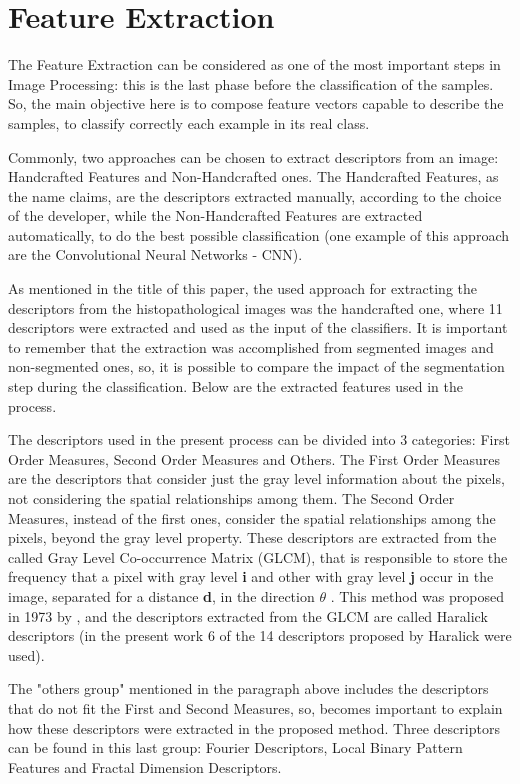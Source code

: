 \documentclass[conference]{IEEEtran}
\begin{document}
	\section{Feature Extraction}
        \par The Feature Extraction can be considered as one of the most important steps in Image Processing: this is the last phase before the classification of the samples. So, the main objective here is to compose feature vectors capable to describe the samples, to classify correctly each example in its real class.
        \par Commonly, two approaches can be chosen to extract descriptors from an image: Handcrafted Features and Non-Handcrafted ones. The Handcrafted Features, as the name claims, are the descriptors extracted manually, according to the choice of the developer, while the Non-Handcrafted Features are extracted automatically, to do the best possible classification (one example of this approach are the Convolutional Neural Networks - CNN).
		\par As mentioned in the title of this paper, the used approach for extracting the descriptors from the histopathological images was the handcrafted one, where 11 descriptors were extracted and used as the input of the classifiers. It is important to remember that the extraction was accomplished from segmented images and non-segmented ones, so, it is possible to compare the impact of the segmentation step during the classification. Below are the extracted features used in the process.
		\par The descriptors used in the present process can be divided into 3 categories: First Order Measures, Second Order Measures and Others. The First Order Measures are the descriptors that consider just the gray level information about the pixels, not considering the spatial relationships among them. The Second Order Measures, instead of the first ones, consider the spatial relationships among the pixels, beyond the gray level property. These descriptors are extracted from the called Gray Level Co-occurrence Matrix (GLCM), that is responsible to store the frequency that a pixel with gray level \textbf{i} and other with gray level \textbf{j} occur in the image, separated for a distance \textbf{d}, in the direction\textbf{ $\theta$} \cite{conci2008computacao}. This method was proposed in 1973 by \cite{haralick:smc1973}, and the descriptors extracted from the GLCM are called Haralick descriptors (in the present work 6 of the 14 descriptors proposed by Haralick were used).
		\par The "others group" mentioned in the paragraph above includes the descriptors that do not fit the First and Second Measures, so, becomes important to explain how these descriptors were extracted in the proposed method. Three descriptors can be found in this last group: Fourier Descriptors, Local Binary Pattern Features and Fractal Dimension Descriptors. 
\end{document}
